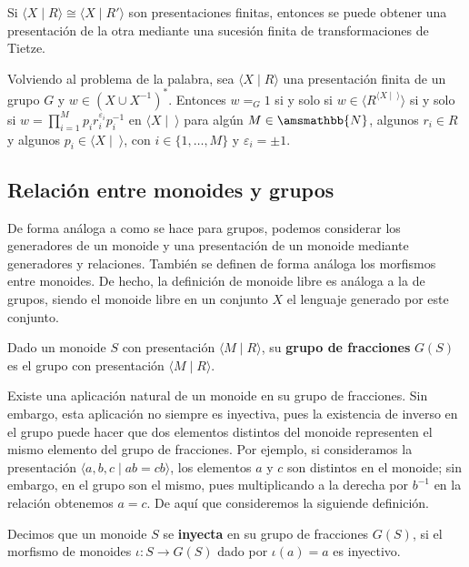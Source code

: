 \documentclass[bibtex, anon]{TEMat-article}
\providecommand{\gene}[1]{\langle{#1}\rangle}
\begin{document}
\begin{teorema}\cite[Proposición 2.1]{combinatorial}
	Si $\gene{X\mid R}\cong\gene{X\mid R'}$ son presentaciones finitas, entonces se puede obtener una presentación de la otra mediante una sucesión finita de transformaciones de Tietze.
\end{teorema}

Volviendo al problema de la palabra, sea $\gene{X\mid R}$ una presentación finita de un grupo $G$ y $w\in (X\cup X^{-1})^*$. Entonces $w=_G 1$ si y solo si $w\in \gene{R^{\gene{X\mid\ }}}$ si y solo si $w=\displaystyle\prod_{i=1}^M p_ir_i^{\varepsilon_i}p_i^{-1}$ en $\gene{X\mid\ }$ para algún $M\in\amsmathbb{N}$, algunos $r_i\in R$ y algunos $p_i\in\gene{X\mid\ }$, con $i\in\{1,\dots, M\}$ y $\varepsilon_i=\pm 1$. 


\subsection{Relación entre monoides y grupos}

De forma análoga a como se hace para grupos, podemos considerar los generadores de un monoide y una presentación de un monoide mediante generadores y relaciones. También se definen de forma análoga los morfismos entre monoides. De hecho, la definición de monoide libre es análoga a la de grupos, siendo el monoide libre en un conjunto $X$ el lenguaje generado por este conjunto.

\begin{definicion}
	Dado un monoide $S$ con presentación $\langle M\mid R\rangle$, su \textbf{grupo de fracciones} $G(S)$ es el grupo con presentación $\langle M\mid R\rangle$.
\end{definicion}

Existe una aplicación natural de un monoide en su grupo de fracciones. Sin embargo, esta aplicación no siempre es inyectiva, pues la existencia de inverso en el grupo puede hacer que dos elementos distintos del monoide representen el mismo elemento del grupo de fracciones. Por ejemplo, si consideramos la presentación $\langle a,b,c\mid ab=cb\rangle$, los elementos $a$ y $c$ son distintos en el monoide; sin embargo, en el grupo son el mismo, pues multiplicando a la derecha por $b^{-1}$ en la relación obtenemos $a=c$. De aquí que consideremos la siguiende definición.

\begin{definicion}
	Decimos que un monoide $S$ se \textbf{inyecta} en su grupo de fracciones $G(S)$, si el morfismo de monoides $\iota: S\to G(S)$ dado por $\iota(a)=a$ es inyectivo.
\end{definicion}
\end{document}
